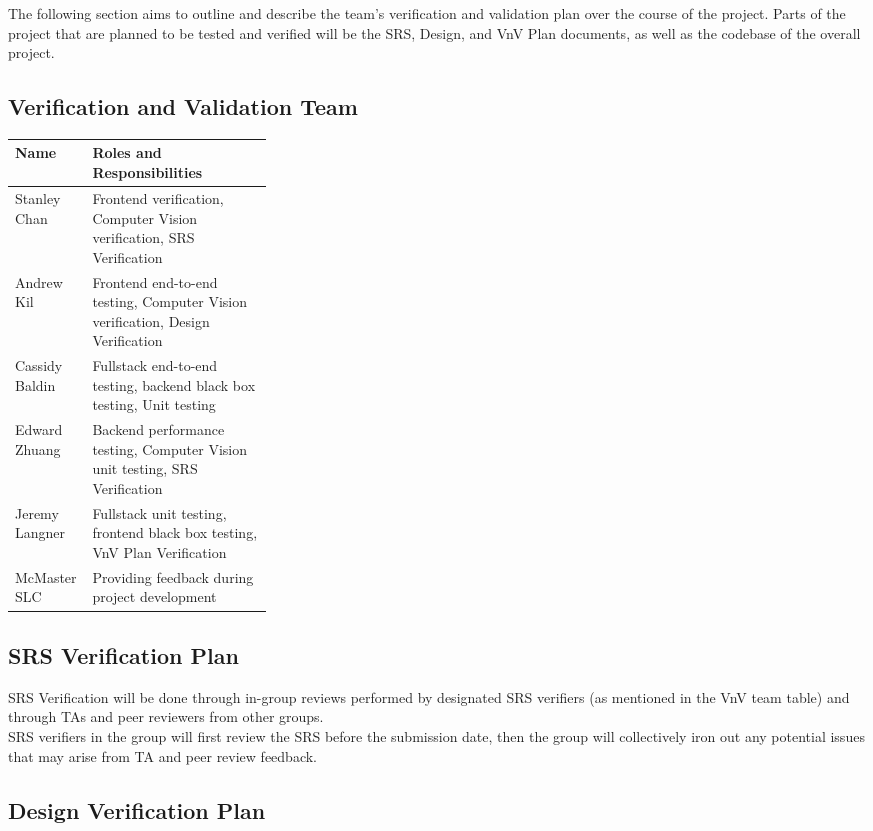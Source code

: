 \documentclass[12pt, titlepage]{article}
\begin{document}
The following section aims to outline and describe the team's verification and validation plan over the course of the project. Parts of
the project that are planned to be tested and verified will be the SRS, Design, and VnV Plan documents, as well as the codebase of the
overall project.

\subsection{Verification and Validation Team}

\begin{tabularx}{\textwidth}{p{0.3\linewidth} | X}
  \toprule
  Name & Roles and Responsibilities \\
  \hline
  Stanley Chan & Frontend verification, Computer Vision verification, SRS Verification \\
  Andrew Kil & Frontend end-to-end testing, Computer Vision verification, Design Verification \\
  Cassidy Baldin & Fullstack end-to-end testing, backend black box testing, Unit testing \\
  Edward Zhuang & Backend performance testing, Computer Vision unit testing, SRS Verification \\
  Jeremy Langner & Fullstack unit testing, frontend black box testing, VnV Plan Verification \\

  McMaster SLC & Providing feedback during project development \\
  \bottomrule
\end{tabularx}

\subsection{SRS Verification Plan}

SRS Verification will be done through in-group reviews performed by designated SRS verifiers (as mentioned in the VnV team table)
and through TAs and peer reviewers from other groups. \\
SRS verifiers in the group will first review the SRS before the submission date, then the group will collectively iron out any
potential issues that may arise from TA and peer review feedback.

\subsection{Design Verification Plan}
\end{document}
